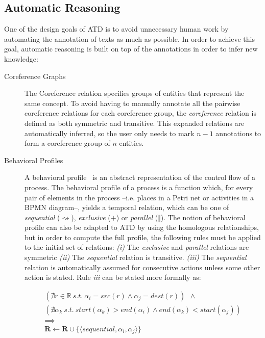 \subsection{Automatic Reasoning}

\label{sec:atd_reasoning}

One of the design goals of ATD is to avoid unnecessary human work by automating
the annotation of texts as much as possible. In order to achieve this goal,
automatic reasoning is built on top of the annotations in order to infer new
knowledge:


\begin{description}

  \item[Coreference Graphs]{The Coreference relation specifies groups of
      entities that represent the same concept. To avoid having to manually
      annotate all the pairwise coreference relations for each coreference
      group, the \emph{coreference} relation is defined as both symmetric and
      transitive. This expanded relations are automatically inferred, so the
      user only needs to mark $n-1$ annotations to form a coreference group of
      $n$ entities.}
  \item[Behavioral Profiles]{A behavioral profile~\cite{smirnov2010business} is
      an abstract representation of the control flow of a process. The
      behavioral profile of a process is a function which, for every pair of
      elements in the process --i.e. places in a Petri net or activities in a
      BPMN diagram--, yields a temporal relation, which can be one of
      \emph{sequential} ($\rightsquigarrow$), \emph{exclusive} ($+$) or
      \emph{parallel} ($\Vert$). The notion of behavioral profile can also be
      adapted to ATD by using the homologous relationships, but in order to
      compute the full profile, the following rules must be applied to the
      initial set of relations: \emph{(i)} The \emph{exclusive} and
      \emph{parallel} relations are symmetric \emph{(ii)} The \emph{sequential}
      relation is transitive. \textit{(iii)} The \emph{sequential} relation is
      automatically assumed for consecutive actions unless some other action is
      stated. Rule \emph{iii} can be stated more formally as:

    \begin{equation*}
      \begin{split}
        (\nexists r \in \mathbb{R} ~s.t.~ \alpha_i = src(r) \land \alpha_j =
        dest(r)) ~~\land~~~~~~~~~~~~~~ \\
        (\nexists \alpha_k ~s.t.~ start(\alpha_k) > end(\alpha_i) \land
        end(\alpha_k) < start(\alpha_j)) \\
        \implies ~~~~~~~~~~~~~~~~~~~~~~~~~~~~~~~~~\\
        \mathbf{R} \leftarrow \mathbf{R} \cup \{\langle sequential, \alpha_i, \alpha_j \rangle\}~~~~~~~~~~~~~~~
      \end{split}
    \end{equation*}

}
\end{description}
